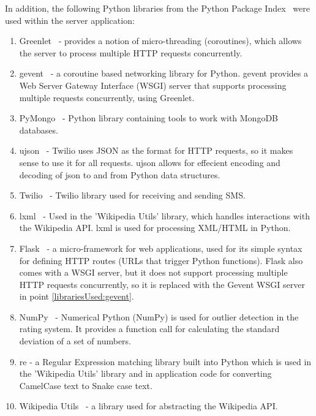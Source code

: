 \documentclass[authoryearcitations]{UoYCSproject}
\begin{document}
In addition, the following Python libraries from the Python Package Index~\cite{pypi} were used within the server application:
\begin{enumerate}
    \item Greenlet~\cite{libraryGreenlet} - provides a notion of micro-threading (coroutines), which allows the server to process multiple HTTP requests concurrently.
    \item gevent~\cite{libraryGevent} \label{librariesUsed:gevent} - a coroutine based networking library for Python. gevent provides a Web Server Gateway Interface (WSGI) server that supports processing multiple requests concurrently, using Greenlet.
    \item PyMongo~\cite{libraryPyMongo} - Python library containing tools to work with MongoDB databases.
    \item ujson~\cite{libraryUjson} - Twilio uses JSON as the format for HTTP requests, so it makes sense to use it for all requests. ujson allows for effecient encoding and decoding of json to and from Python data structures.
    \item Twilio~\cite{libraryTwilio} - Twilio library used for receiving and sending SMS.
    \item lxml~\cite{libraryLxml} - Used in the 'Wikipedia Utils' library, which handles interactions with the Wikipedia API. lxml is used for processing XML/HTML in Python.
    \item Flask~\cite{libraryFlask} - a micro-framework for web applications, used for its simple syntax for defining HTTP routes (URLs that trigger Python functions). Flask also comes with a WSGI server, but it does not support processing multiple HTTP requests concurrently, so it is replaced with the Gevent WSGI server in point \ref{librariesUsed:gevent}.
    \item NumPy~\cite{libraryNumPy} - Numerical Python (NumPy) is used for outlier detection in the rating system. It provides a function call for calculating the standard deviation of a set of numbers.
    \item re - a Regular Expression matching library built into Python which is used in the 'Wikipedia Utils' library and in application code for converting CamelCase text to Snake case text.
    \item Wikipedia Utils~\cite{libraryWikipediaUtils} - a library used for abstracting the Wikipedia API.
\end{enumerate}
\end{document}
